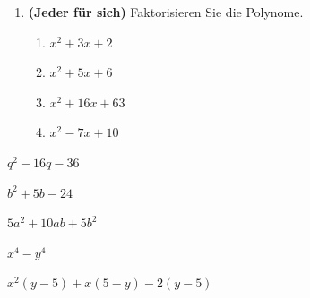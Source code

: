 \begin{LA}
\begin{enumerate}
        \item \textbf{(Jeder für sich)} Faktorisieren Sie die Polynome.
              \begin{enumerate}
                  \item \(x^2+3x+2\)    \vspace*{0.5cm}
                  \item \(x^2+5x+6\)    \vspace*{0.5cm}
                  \item \(x^2+16x+63\)    \vspace*{0.5cm}
                  \item \(x^2-7x+10\)    \vspace*{0.5cm}
              \end{enumerate}
    \end{enumerate}
\end{LA}

\clearpage

\begin{bsp}
    {}{}
    \( q^2 -16q -36\)
    \vspace*{0.5cm}
\end{bsp}

\begin{bsp}
    {}{}
    \( b^2 +5b -24\)
    \vspace*{0.5cm}
\end{bsp}


\begin{bsp}
    {}{}
    \( 5a^2+10ab+5b^2\)
    \vspace*{0.5cm}
\end{bsp}


\begin{bsp}
    {}{}
    \( x^4-y^4\)
    \vspace*{0.5cm}
\end{bsp}


\begin{bsp}
    {}{}
    \( x^2(y-5)+x(5-y)-2(y-5)\)
    \vspace*{2cm}
\end{bsp}

